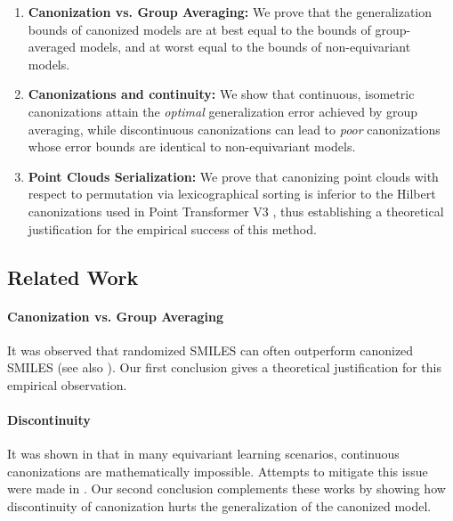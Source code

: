 \documentclass{article}
\theoremstyle{definition}
\theoremstyle{plain}
\begin{document}
\begin{enumerate}
\item \textbf{Canonization vs. Group Averaging:} We prove that the generalization bounds of canonized models are at best equal to the bounds of group-averaged models, and at worst equal to the bounds of non-equivariant models.

\item \textbf{Canonizations and continuity:} We show that continuous, isometric canonizations attain the \emph{optimal} generalization error achieved by group averaging, while discontinuous canonizations can lead to \emph{poor} canonizations whose error bounds are identical to non-equivariant models.

\item \textbf{Point Clouds Serialization:} We prove that 
canonizing point clouds with respect to permutation via lexicographical sorting is inferior to the  Hilbert canonizations used in  Point Transformer V3 \cite{wu2024ptv3}, thus establishing a theoretical justification for the empirical success of this method.
\end{enumerate}


\subsection{Related Work} 
\paragraph{Canonization vs. Group Averaging} It was observed that randomized SMILES can often outperform canonized SMILES \cite{ArusPous2019,Bjerrum2017SMILESEA} (see also \cite{ito2026random}). Our first conclusion gives a theoretical justification for this empirical observation.

 \paragraph{Discontinuity} It was shown in \cite{dym2024equivariant,pmlr-v235-baker24a} that in many equivariant learning scenarios, continuous canonizations are mathematically impossible. Attempts to mitigate this issue were made in  \cite{tahmasebi2025regularity,lin2026adaptive}. Our second conclusion complements these works by showing how discontinuity of canonization hurts the generalization of the canonized model.  
\end{document}
